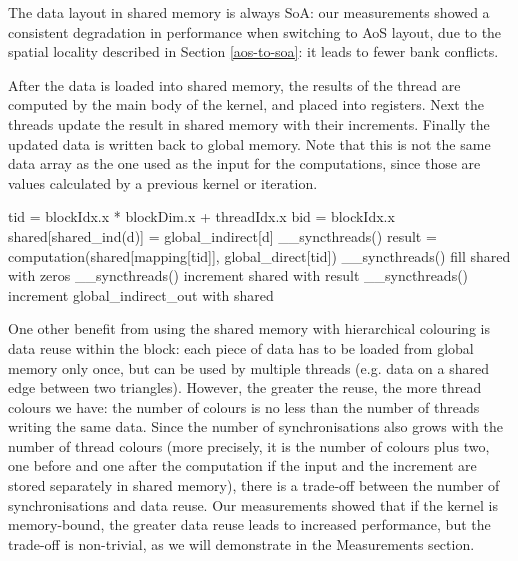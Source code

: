 The data layout in shared memory is always SoA: our measurements showed a
consistent degradation in performance when switching to AoS layout, due to the
spatial locality described in Section \ref{aos-to-soa}: it leads to fewer bank
conflicts.

After the data is loaded into shared memory, the results of the thread are
computed by the main body of the kernel, and placed into registers.  Next the
threads update the result in shared memory with their increments. Finally the
updated data is written back to global memory. Note that this is not the same
data array as the one used as the input for the computations, since those are
values calculated by a previous kernel or iteration.

\begin{algorithm}
  \begin{algorithmic}
    \State tid = blockIdx.x * blockDim.x + threadIdx.x
    \State bid = blockIdx.x
      \State shared[shared\_ind(d)] = global\_indirect[d]
    \EndFor
    \State \_\_syncthreads()
    \State result = computation(shared[mapping[tid]], global\_direct[tid])
    \State \_\_syncthreads()
    \State fill shared with zeros
    \State \_\_syncthreads()
        \State increment shared with result
      \EndIf
      \State \_\_syncthreads()
    \EndFor
      \State increment global\_indirect\_out with shared
    \EndFor
  \end{algorithmic}
  \caption{Algorithm to use the shared memory to preload indirect data accessed
  within a thread block. \lstinline!global_indirect! holds the data indirectly
  read, \lstinline!global_indirect_out! holds the result of the iteration.}
  \label{code:shared}
\end{algorithm}

One other benefit from using the shared memory with hierarchical colouring is
data reuse within the block: each piece of data has to be loaded from global
memory only once, but can be used by multiple threads (e.g. data on a shared
edge between two triangles). However, the greater the reuse, the more thread
colours we have: the number of colours is no less than the number of threads
writing the same data. Since the number of synchronisations also grows with the
number of thread colours (more precisely, it is the number of colours plus two,
one before and one after the computation if the input and the increment are
stored separately in shared memory), there is a trade-off between the number of
synchronisations and data reuse. Our measurements showed that if the kernel is
memory-bound, the greater data reuse leads to increased performance, but the
trade-off is non-trivial, as we will demonstrate in the Measurements section.

